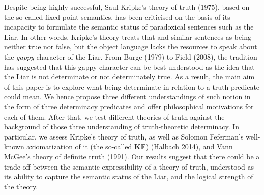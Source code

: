 \documentclass[bsl,meeting]{asl}
\newcommand{\NP}{}
\begin{document}
\thispagestyle{empty}


\NP  
{}


 Despite being highly successful, Saul Kripke's theory of truth (1975), based on the so-called fixed-point semantics, has been criticised on the basis of its incapacity to formulate the semantic status of paradoxical sentences such as the Liar. In other words, Kripke's theory treats that and similar sentences as being neither true nor false, but the object language lacks the resources to speak about the \textit{gappy} character of the Liar. From Burge (1979) to Field (2008), the tradition has suggested that this gappy character can be best understood as the idea that the Liar is not determinate or not determinately true. As a result, the main aim of this paper is to explore what being determinate in relation to a truth predicate could mean. We hence propose three different understandings of such notion in the form of three determinacy predicates and offer philosophical motivations for each of them. After that, we test different theories of truth against the background of those three understanding of truth-theoretic determinacy. In particular, we assess Kripke's theory of truth, as well as Solomon Feferman's well-known axiomatization of it (the so-called \textbf{KF}) (Halbach 2014), and Vann McGee's theory of definite truth (1991). Our results suggest that there could be a trade-off between the semantic expressibility of a theory of truth, understood as its ability to capture the semantic status of the Liar, and the logical strength of the theory.
\end{document}
